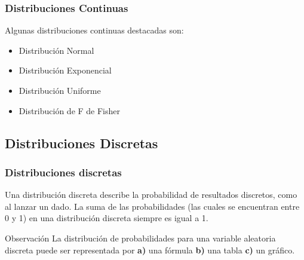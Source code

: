 \documentclass[aspectratio=169]{beamer}
\begin{document}
\begin{frame}
\frametitle{Distribuciones Continuas}

Algunas distribuciones continuas destacadas son:

\begin{itemize}
    \item Distribución Normal
    \item Distribución Exponencial
    \item Distribución Uniforme
    \item Distribución de F de Fisher
\end{itemize}

\end{frame}







\subsection{Distribuciones Discretas}
\begin{frame}
\frametitle{Distribuciones discretas}
Una distribución discreta describe la probabilidad de resultados discretos, como al lanzar un dado. La suma de las probabilidades (las cuales se encuentran entre 0 y 1) en una distribución discreta siempre es igual a 1.


\vfill

\begin{block}{Observación}
La distribución de probabilidades para una variable aleatoria discreta puede ser representada por {\bf a)} una fórmula {\bf b)} una tabla {\bf c)} un gráfico.
\end{block}

\end{frame}



\end{document}
